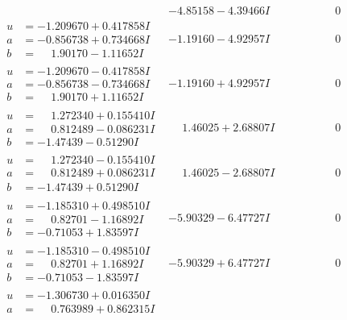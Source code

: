 \documentclass[1p]{elsarticle_modified}
\theoremstyle{definition}
\begin{document}
$$\begin{array}{c|c|c}
 & -4.85158 - 4.39466 I & \phantom{-0.000000 } 0 \\ \hline\begin{aligned}
u &= -1.209670 + 0.417858 I \\
a &= -0.856738 + 0.734668 I \\
b &= \phantom{-}1.90170 - 1.11652 I\end{aligned}
 & -1.19160 - 4.92957 I & \phantom{-0.000000 } 0 \\ \hline\begin{aligned}
u &= -1.209670 - 0.417858 I \\
a &= -0.856738 - 0.734668 I \\
b &= \phantom{-}1.90170 + 1.11652 I\end{aligned}
 & -1.19160 + 4.92957 I & \phantom{-0.000000 } 0 \\ \hline\begin{aligned}
u &= \phantom{-}1.272340 + 0.155410 I \\
a &= \phantom{-}0.812489 - 0.086231 I \\
b &= -1.47439 - 0.51290 I\end{aligned}
 & \phantom{-}1.46025 + 2.68807 I & \phantom{-0.000000 } 0 \\ \hline\begin{aligned}
u &= \phantom{-}1.272340 - 0.155410 I \\
a &= \phantom{-}0.812489 + 0.086231 I \\
b &= -1.47439 + 0.51290 I\end{aligned}
 & \phantom{-}1.46025 - 2.68807 I & \phantom{-0.000000 } 0 \\ \hline\begin{aligned}
u &= -1.185310 + 0.498510 I \\
a &= \phantom{-}0.82701 - 1.16892 I \\
b &= -0.71053 + 1.83597 I\end{aligned}
 & -5.90329 - 6.47727 I & \phantom{-0.000000 } 0 \\ \hline\begin{aligned}
u &= -1.185310 - 0.498510 I \\
a &= \phantom{-}0.82701 + 1.16892 I \\
b &= -0.71053 - 1.83597 I\end{aligned}
 & -5.90329 + 6.47727 I & \phantom{-0.000000 } 0 \\ \hline\begin{aligned}
u &= -1.306730 + 0.016350 I \\
a &= \phantom{-}0.763989 + 0.862315 I \\

\end{aligned}
\end{array}$$
\end{document}
